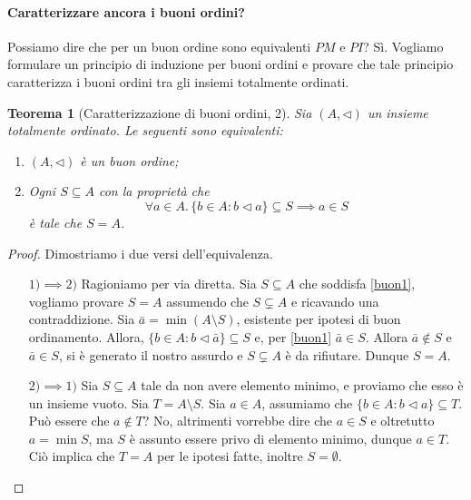 \documentclass[fontsize = 11 pt, paper=A4, oneside, index=totoc, hyperref]{article}
\theoremstyle{definition}
\theoremstyle{plain}
\newtheorem{thm}{Teorema}[section]
\begin{document}
\paragraph{Caratterizzare ancora i buoni ordini?} Possiamo dire che per un buon ordine sono equivalenti \(PM\) e \(PI\)? Sì. Vogliamo formulare un principio di induzione per buoni ordini e provare che tale principio caratterizza i buoni ordini tra gli insiemi totalmente ordinati.

\begin{thm}[Caratterizzazione di buoni ordini, 2]
  Sia \((A,\lhd)\) un insieme totalmente ordinato. Le seguenti sono equivalenti:
  \begin{enumerate}
    \item \((A,\lhd)\) è un buon ordine;
    \item Ogni \(S \subseteq A\) con la proprietà che
    \begin{equation}
      \forall a \in A.\, \lbrace b \in A \colon b \lhd a\rbrace \subseteq S \implies a \in S \label{buon1}
      \end{equation} è tale che \(S = A\).
  \end{enumerate}
\end{thm}
\begin{proof} Dimostriamo i due versi dell'equivalenza.
  \begin{itemize}
    \item[\(1) \implies 2)\)] Ragioniamo per via diretta. Sia \(S \subseteq A\) che soddisfa \eqref{buon1}, vogliamo provare \(S = A\) assumendo che \(S \subsetneq A\) e ricavando una contraddizione. Sia \(\bar{a} = \min (A \setminus S)\), esistente per ipotesi di buon ordinamento. Allora, \(\lbrace b \in A \colon b \lhd \bar{a} \rbrace \subseteq S\) e, per \eqref{buon1} \(\bar{a} \in S\). Allora \(\bar{a} \notin S\) e \(\bar{a} \in S\), si è generato il nostro assurdo e \(S \subsetneq A\) è da rifiutare. Dunque \(S = A\).
    \item[\(2) \implies 1)\)] Sia \(S \subseteq A\) tale da non avere elemento minimo, e proviamo che esso è un insieme vuoto. Sia \(T = A \setminus S\). Sia \(a \in A\), assumiamo che \(\lbrace b \in A \colon b \lhd a \rbrace \subseteq T\). Può essere che \(a \notin T\)? No, altrimenti vorrebbe dire che \(a \in S\) e oltretutto \(a = \min S\), ma \(S\) è assunto essere privo di elemento minimo, dunque \(a \in T\). Ciò implica che \(T = A\) per le ipotesi fatte, inoltre \(S = \emptyset\).
  \end{itemize}
\end{proof}
\end{document}
